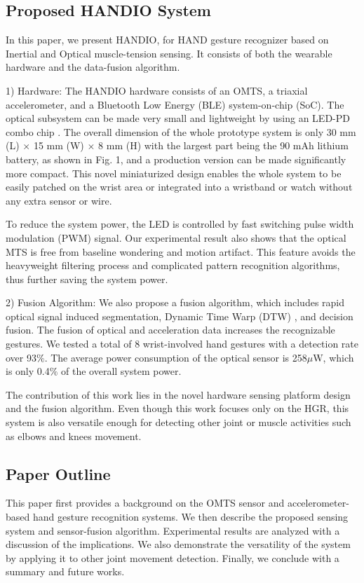 \subsection{Proposed HANDIO System}
In this paper, we present HANDIO, for HAND gesture recognizer
based on Inertial and Optical muscle-tension sensing.
It consists of both the wearable hardware and the data-fusion
algorithm.

1) Hardware: The HANDIO hardware consists of an
OMTS, a triaxial accelerometer, and a Bluetooth Low Energy
(BLE) system-on-chip (SoC). The optical subsystem can be
made very small and lightweight by using an LED-PD combo
chip \cite{c10}. The overall dimension of the whole prototype system
is only 30 mm (L) $\times$ 15 mm (W) $\times$ 8 mm (H) with the largest
part being the 90 mAh lithium battery, as shown in Fig. 1, and
a production version can be made significantly more compact.
This novel miniaturized design enables the whole system to be
easily patched on the wrist area or integrated into a wristband
or watch without any extra sensor or wire.

To reduce the system power, the LED is controlled by fast switching pulse width modulation (PWM) signal. Our
experimental result also shows that the optical MTS is free
from baseline wondering and motion artifact. This feature
avoids the heavyweight filtering process and complicated pattern
recognition algorithms, thus further saving the system
power.

2) Fusion Algorithm: We also propose a fusion algorithm,
which includes rapid optical signal induced segmentation,
Dynamic Time Warp (DTW) \cite{c11}, and decision fusion. The
fusion of optical and acceleration data increases the recognizable
gestures. We tested a total of 8 wrist-involved hand
gestures with a detection rate over 93$\%$. The average power
consumption of the optical sensor is 258$\mu$W, which is only
0.4$\%$ of the overall system power.

The contribution of this work lies in the novel hardware
sensing platform design and the fusion algorithm. Even though
this work focuses only on the HGR, this system is also versatile
enough for detecting other joint or muscle activities such as
elbows and knees movement.
\subsection{Paper Outline}
This paper first provides a background on the OMTS sensor
and accelerometer-based hand gesture recognition systems. We
then describe the proposed sensing system and sensor-fusion
algorithm. Experimental results are analyzed with a discussion
of the implications. We also demonstrate the versatility of
the system by applying it to other joint movement detection.
Finally, we conclude with a summary and future works.